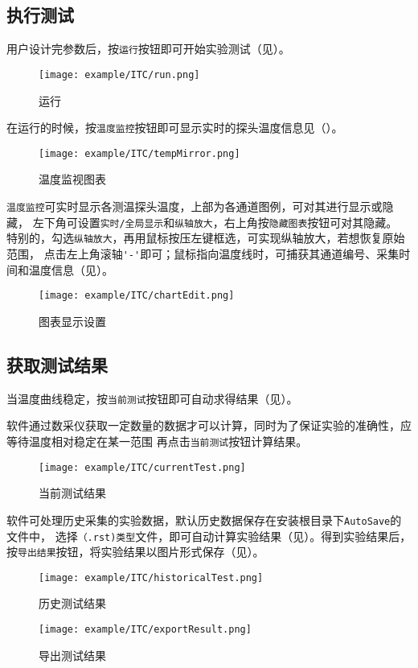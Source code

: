 \subsection{执行测试}
用户设计完参数后，按\lstinline{运行}按钮即可开始实验测试（见）。
\begin{figure}[htbp]
	\centering
	\texttt{[image: example/ITC/run.png]}
	\caption{ 运行 \label{fig:exmp_run}}
\end{figure}
在运行的时候，按\lstinline{温度监控}按钮即可显示实时的探头温度信息见（）。
\begin{figure}[htbp]
	\centering
	\texttt{[image: example/ITC/tempMirror.png]}
	\caption{ 温度监视图表 \label{fig:exmp_tempMirror}}
\end{figure}
\lstinline{温度监控}可实时显示各测温探头温度，上部为各通道图例，可对其进行显示或隐藏，
左下角可设置\lstinline{实时/全局显示}和\lstinline{纵轴放大}，右上角按\lstinline{隐藏图表}按钮可对其隐藏。
特别的，勾选\lstinline{纵轴放大}，再用鼠标按压左键框选，可实现纵轴放大，若想恢复原始范围，
点击左上角滚轴\lstinline{'-'}即可；鼠标指向温度线时，可捕获其通道编号、采集时间和温度信息（见）。\\
\begin{figure}[htbp]
	\centering
	\texttt{[image: example/ITC/chartEdit.png]}
	\caption{ 图表显示设置 \label{fig:exmp_chartEdit}}
\end{figure}

\subsection{获取测试结果}
	当温度曲线稳定，按\lstinline{当前测试}按钮即可自动求得结果（见）。
\begin{note}
	软件通过数采仪获取一定数量的数据才可以计算，同时为了保证实验的准确性，应等待温度相对稳定在某一范围
再点击\lstinline{当前测试}按钮计算结果。
\end{note}
\begin{figure}[htbp]
	\centering
	\texttt{[image: example/ITC/currentTest.png]}
	\caption{ 当前测试结果 \label{fig:exmp_currentTest}}
\end{figure}
软件可处理历史采集的实验数据，默认历史数据保存在安装根目录下\lstinline{AutoSave}的文件中，
选择\lstinline{（.rst)类型}文件，即可自动计算实验结果（见）。得到实验结果后，
按\lstinline{导出结果}按钮，将实验结果以图片形式保存（见）。
\begin{figure}[htbp]
	\centering
	\texttt{[image: example/ITC/historicalTest.png]}
	\caption{ 历史测试结果 \label{fig:exmp_historicalTest}}
\end{figure}

\begin{figure}[htbp]
	\centering
	\texttt{[image: example/ITC/exportResult.png]}
	\caption{ 导出测试结果 \label{fig:exmp_exportResult}}
\end{figure}